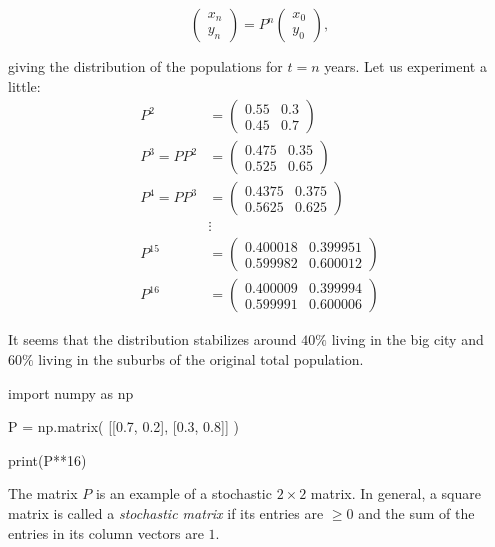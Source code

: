 \documentclass{article}
\begin{document}
\begin{example}
\begin{equation}[emph]\label{markovformel}
\begin{pmatrix} x_n \\ y_n \end{pmatrix} = 
P^n
\begin{pmatrix} x_0 \\ y_0 \end{pmatrix},
\end{equation}

giving the distribution of the populations for $t = n$
years. Let us experiment a little:
\begin{align*}
P^2 &= 
\begin{pmatrix}
0.55 & 0.3\\
0.45 & 0.7
\end{pmatrix}\\
P^3 = P P^2 &=
\begin{pmatrix} 
0.475 & 0.35\\
0.525 & 0.65
\end{pmatrix}\\
P^4 = P P^3 &=
\begin{pmatrix} 
0.4375 & 0.375\\
0.5625 & 0.625
\end{pmatrix}\\
&\vdots\\
P^{15} &= 
\begin{pmatrix} 
0.400018 & 0.399951\\
0.599982 & 0.600012
\end{pmatrix}\\
P^{16} &= 
\begin{pmatrix} 
0.400009 & 0.399994\\
0.599991 & 0.600006
\end{pmatrix}
\end{align*}

It seems that the distribution stabilizes around $40\%$ living
in the big city and $60\%$ living in the suburbs of the
original total population.

\begin{sage}
import numpy as np

P = np.matrix( [[0.7, 0.2], [0.3, 0.8]] )

print(P**16)
\end{sage}


The matrix $P$ is an example of a stochastic $2\times 2$ matrix. 
In general, a square matrix is called a \emph{stochastic matrix} if its entries are
$\geq 0$ and the sum of the entries in its column vectors are $1$.
\end{example}
\end{document}
